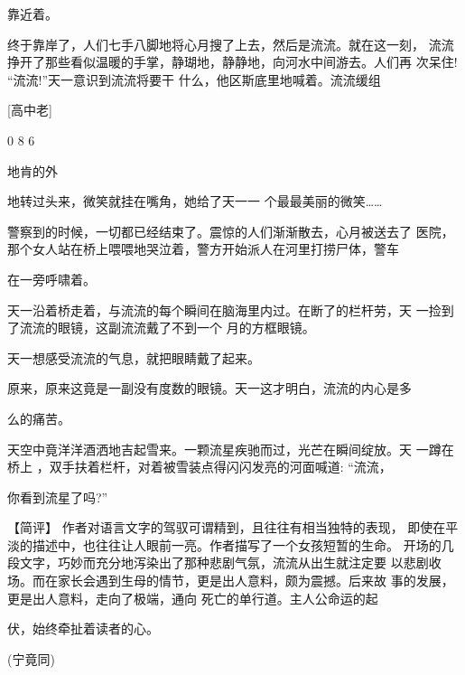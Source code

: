 \documentclass{article}
\begin{document}
靠近着。 

终于靠岸了，人们七手八脚地将心月搜了上去，然后是流流。就在这一刻，
流流挣开了那些看似温暖的手掌，静瑚地，静静地，向河水中间游去。人们再
次呆住! “流流!”天一意识到流流将要干
什么，他区斯底里地喊着。流流缓组 

\newpage


[高中老] 


0 8 6 


地肯的外

地转过头来，微笑就挂在嘴角，她给了天一一
个最最美丽的微笑…… 

警察到的时候，一切都已经结束了。震惊的人们渐渐散去，心月被送去了
医院，那个女人站在桥上喂喂地哭泣着，警方开始派人在河里打捞尸体，警车

在一旁呼啸着。 

天一沿着桥走着，与流流的每个瞬间在脑海里内过。在断了的栏杆劳，天
一捡到了流流的眼镜，这副流流戴了不到一个
月的方框眼镜。 

\newpage

天一想感受流流的气息，就把眼睛戴了起来。

原来，原来这竟是一副没有度数的眼镜。天一这才明白，流流的内心是多

么的痛苦。 

天空中竟洋洋酒洒地吉起雪来。一颗流星疾驰而过，光芒在瞬间绽放。天
一蹲在桥上 ，双手扶着栏杆，对着被雪装点得闪闪发亮的河面喊道: “流流，

你看到流星了吗?” 

【简评】  作者对语言文字的驾驭可谓精到，且往往有相当独特的表现，
即使在平淡的描述中，也往往让人眼前一亮。作者描写了一个女孩短暂的生命。
开场的几段文字，巧妙而充分地泻染出了那种悲剧气氛，流流从出生就注定要
以悲剧收场。而在家长会遇到生母的情节，更是出人意料，颇为震撼。后来故
事的发展，更是出人意料，走向了极端，通向
\newpage
死亡的单行道。主人公命运的起

伏，始终牵扯着读者的心。 


(宁竟同) 
\end{document}
